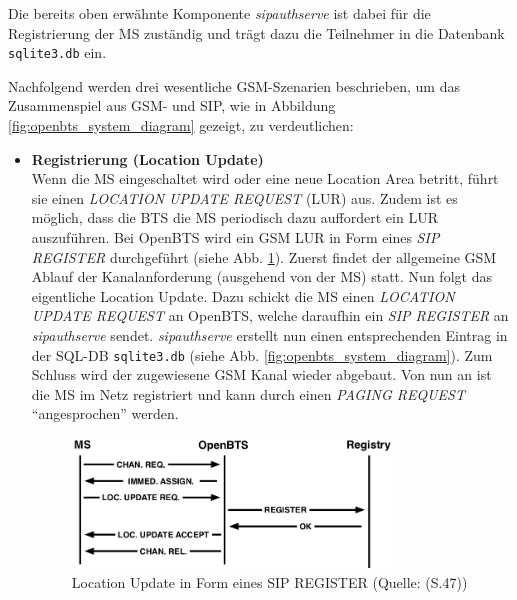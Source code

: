 Die bereits oben erwähnte Komponente \textit{sipauthserve} ist dabei für die Registrierung der MS zuständig und trägt dazu  die Teilnehmer in die Datenbank \verb|sqlite3.db| ein.

Nachfolgend werden drei wesentliche GSM-Szenarien beschrieben, um das Zusammenspiel aus GSM- und SIP, wie in Abbildung \ref{fig:openbts_system_diagram} gezeigt, zu verdeutlichen:

\begin{itemize}
\item \textbf{Registrierung (Location Update)}\\
Wenn die MS eingeschaltet wird oder eine neue Location Area betritt, führt sie einen \textit{LOCATION UPDATE REQUEST} (LUR) aus. Zudem ist es möglich, dass die BTS die MS periodisch dazu auffordert ein LUR auszuführen. Bei OpenBTS wird ein GSM LUR in Form eines \textit{SIP REGISTER} durchgeführt (siehe Abb. \ref{fig:openbts_registration}). Zuerst findet der allgemeine GSM Ablauf der Kanalanforderung (ausgehend von der MS) statt. Nun folgt das eigentliche Location Update. Dazu schickt die MS einen \textit{LOCATION UPDATE REQUEST} an OpenBTS, welche daraufhin ein \textit{SIP REGISTER} an \textit{sipauthserve} sendet. \textit{sipauthserve} erstellt nun einen entsprechenden Eintrag in der SQL-DB \verb|sqlite3.db| (siehe Abb. \ref{fig:openbts_system_diagram}). Zum Schluss wird der zugewiesene GSM Kanal wieder abgebaut. Von nun an ist die MS im Netz registriert und kann durch einen \textit{PAGING REQUEST} "`angesprochen"' werden.
\begin{figure}[h]
	\centering
		\includegraphics[width=0.80\textwidth]{img/openbts_registration.png}
	\caption{Location Update in Form eines SIP REGISTER (Quelle: \cite{bib:openbtsmanual}(S.47))}
	\label{fig:openbts_registration}
\end{figure}
\end{itemize}
